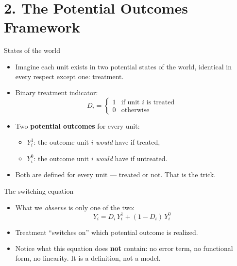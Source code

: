 \documentclass[
  11pt,
  ignorenonframetext,
  aspectratio=169,
]{beamer}
\providecommand{\tightlist}{%
  \setlength{\itemsep}{0pt}\setlength{\parskip}{0pt}}
\begin{document}
\section{2. The Potential Outcomes
Framework}\label{the-potential-outcomes-framework}

\begin{frame}{States of the world}
\protect{}\label{states-of-the-world}
\begin{itemize}
\tightlist
\item
  Imagine each unit exists in two potential states of the world,
  identical in every respect except one: treatment.
\item
  Binary treatment indicator: \[
  D_i = \begin{cases} 1 & \text{if unit } i \text{ is treated} \\ 0 & \text{otherwise} \end{cases}
  \]
\item
  Two \textbf{potential outcomes} for every unit:

  \begin{itemize}
  \tightlist
  \item
    \(Y_i^1\): the outcome unit \(i\) \emph{would} have if treated,
  \item
    \(Y_i^0\): the outcome unit \(i\) \emph{would} have if untreated.
  \end{itemize}
\item
  Both are defined for every unit --- treated or not. That is the trick.
\end{itemize}
\end{frame}

\begin{frame}{The switching equation}
\protect{}\label{the-switching-equation}
\begin{itemize}
\tightlist
\item
  What we \emph{observe} is only one of the two: \[
  Y_i = D_i\, Y_i^1 + (1 - D_i)\, Y_i^0
  \]
\item
  Treatment ``switches on'' which potential outcome is realized.
\item
  Notice what this equation does \textbf{not} contain: no error term, no
  functional form, no linearity. It is a definition, not a model.
\end{itemize}
\end{frame}
\end{document}
